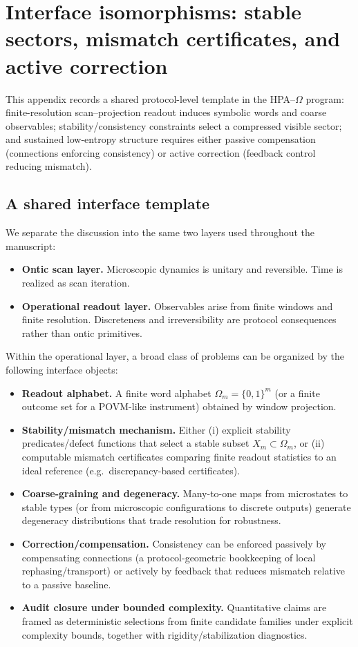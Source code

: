 \section{Interface isomorphisms: stable sectors, mismatch certificates, and active correction}
\label{app:isomorphism_dictionary}

This appendix records a shared protocol-level template in the HPA--$\Omega$ program: finite-resolution scan--projection readout induces symbolic words and coarse observables; stability/consistency constraints select a compressed visible sector; and sustained low-entropy structure requires either passive compensation (connections enforcing consistency) or active correction (feedback control reducing mismatch).

\subsection{A shared interface template}
We separate the discussion into the same two layers used throughout the manuscript:
\begin{itemize}
  \item \textbf{Ontic scan layer.} Microscopic dynamics is unitary and reversible. Time is realized as scan iteration.
  \item \textbf{Operational readout layer.} Observables arise from finite windows and finite resolution. Discreteness and irreversibility are protocol consequences rather than ontic primitives.
\end{itemize}
Within the operational layer, a broad class of problems can be organized by the following interface objects:
\begin{itemize}
  \item \textbf{Readout alphabet.} A finite word alphabet $\Omega_m=\{0,1\}^m$ (or a finite outcome set for a POVM-like instrument) obtained by window projection.
  \item \textbf{Stability/mismatch mechanism.} Either (i) explicit stability predicates/defect functions that select a stable subset $X_m\subset\Omega_m$, or (ii) computable mismatch certificates comparing finite readout statistics to an ideal reference (e.g.\ discrepancy-based certificates).
  \item \textbf{Coarse-graining and degeneracy.} Many-to-one maps from microstates to stable types (or from microscopic configurations to discrete outputs) generate degeneracy distributions that trade resolution for robustness.
  \item \textbf{Correction/compensation.} Consistency can be enforced passively by compensating connections (a protocol-geometric bookkeeping of local rephasing/transport) or actively by feedback that reduces mismatch relative to a passive baseline.
  \item \textbf{Audit closure under bounded complexity.} Quantitative claims are framed as deterministic selections from finite candidate families under explicit complexity bounds, together with rigidity/stabilization diagnostics.
\end{itemize}

